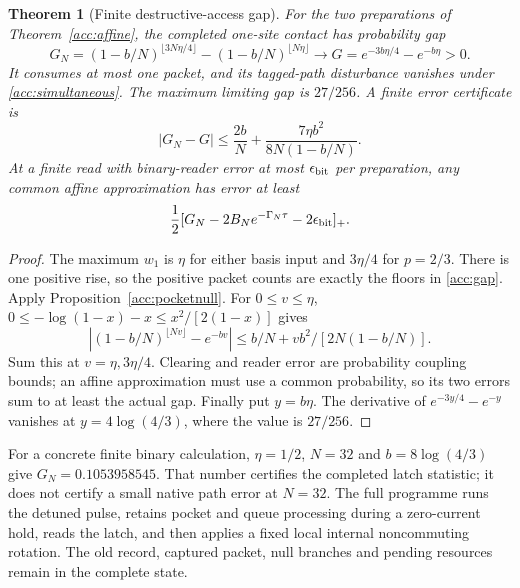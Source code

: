 \documentclass[11pt,oneside,openany]{book}
\newtheorem{theorem}{Theorem}[chapter]
\theoremstyle{definition}
\theoremstyle{remark}\newtheorem{remark}[theorem]{Remark}
\begin{document}
\begin{theorem}[Finite destructive-access gap]\label{acc:destructivegap}
For the two preparations of Theorem~\ref{acc:affine}, the completed
one-site contact has probability gap
\begin{equation}
 G_N=(1-b/N)^{\lfloor3N\eta/4\rfloor}
 -(1-b/N)^{\lfloor N\eta\rfloor}
 \longrightarrow G=e^{-3b\eta/4}-e^{-b\eta}>0.
 \label{acc:gap}
\end{equation}
It consumes at most one packet, and its tagged-path disturbance vanishes
under \eqref{acc:simultaneous}. The maximum limiting gap is $27/256$.
A finite error certificate is
\begin{equation}
 |G_N-G|\le\frac{2b}{N}
 +\frac{7\eta b^2}{8N(1-b/N)}.
 \label{acc:finitegap}
\end{equation}
At a finite read with binary-reader error at most $\epsilon_{
\rm bit}$
per preparation, any common affine approximation has error at least
\[
 \frac12[G_N-2B_Ne^{-\Gamma_N\tau}-2\epsilon_{
\rm bit}]_+.
\]
\end{theorem}
\begin{proof}
The maximum $w_1$ is $\eta$ for either basis input and $3\eta/4$ for
$p=2/3$. There is one positive rise, so the positive packet counts are
exactly the floors in \eqref{acc:gap}. Apply
Proposition~\ref{acc:pocketnull}. For $0\le v\le\eta$,
$0\le-\log(1-x)-x\le x^2/[2(1-x)]$ gives
\[
 |(1-b/N)^{\lfloor Nv\rfloor}-e^{-bv}|
 \le b/N+vb^2/[2N(1-b/N)].
\]
Sum this at $v=\eta,3\eta/4$. Clearing and reader error are probability
coupling bounds; an affine approximation must use a common probability,
so its two errors sum to at least the actual gap. Finally put $y=b\eta$.
The derivative of $e^{-3y/4}-e^{-y}$ vanishes at
$y=4\log(4/3)$, where the value is $27/256$.
\end{proof}

For a concrete finite binary calculation, $\eta=1/2$, $N=32$ and
$b=8\log(4/3)$ give $G_N=0.1053958545$. That number certifies the completed
latch statistic; it does not certify a small native path error at $N=32$.
The full programme runs the detuned pulse, retains pocket and queue
processing during a zero-current hold, reads the latch, and then applies
a fixed local internal noncommuting rotation. The old record, captured
packet, null branches and pending resources remain in the complete state.
\end{document}
